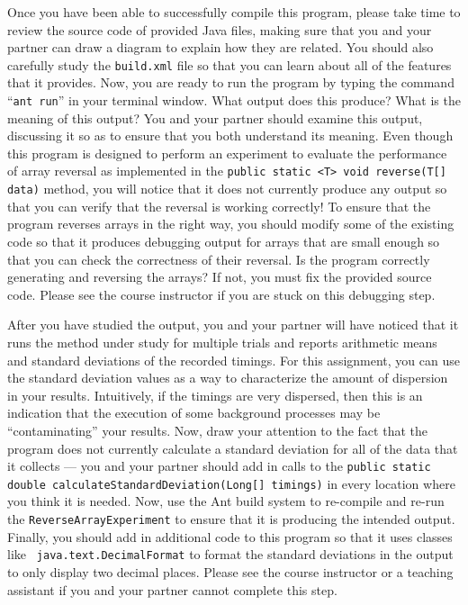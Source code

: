 \vspace*{-.1in}

Once you have been able to successfully compile this program, please take time to review the source code of provided
Java files, making sure that you and your partner can draw a diagram to explain how they are related. You should also
carefully study the {\tt build.xml} file so that you can learn about all of the features that it provides.  Now, you are
ready to run the program by typing the command ``{\tt ant run}'' in your terminal window. What output does this produce?
What is the meaning of this output? You and your partner should examine this output, discussing it so as to ensure that
you both understand its meaning. Even though this program is designed to perform an experiment to evaluate the
performance of array reversal as implemented in the {\tt public static <T> void reverse(T[] data)} method, you will
notice that it does not currently produce any output so that you can verify that the reversal is working correctly! To
ensure that the program reverses arrays in the right way, you should modify some of the existing code so that it
produces debugging output for arrays that are small enough so that you can check the correctness of their reversal. Is
the program correctly generating and reversing the arrays? If not, you must fix the provided source code. Please see the
course instructor if you are stuck on this debugging step.

After you have studied the output, you and your partner will have noticed that it runs the method under study for
multiple trials and reports arithmetic means and standard deviations of the recorded timings. For this assignment, you
can use the standard deviation values as a way to characterize the amount of dispersion in your results. Intuitively, if
the timings are very dispersed, then this is an indication that the execution of some background processes may be
``contaminating'' your results. Now, draw your attention to the fact that the program does not currently calculate a
standard deviation for all of the data that it collects --- you and your partner should add in calls to the {\tt public
static double calculateStandardDeviation(Long[] timings)} in every location where you think it is needed.  Now, use the
Ant build system to re-compile and re-run the {\tt ReverseArrayExperiment} to ensure that it is producing the intended
output. Finally, you should add in additional code to this program so that it uses classes like {\tt
java.text.DecimalFormat} to format the standard deviations in the output to only display two decimal places. Please see
the course instructor or a teaching assistant if you and your partner cannot complete this step.

